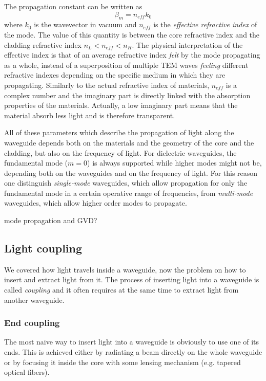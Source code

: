 The propagation constant can be written as
\begin{equation}
\beta_m = n_{eff} k_0
\end{equation}
where $k_0$ is the wavevector in vacuum and $n_{eff}$ is the \textit{effective refractive index} of the mode.
The value of this quantity is between the core refractive index and the cladding refractive index $n_L < n_{eff} < n_H$.
The physical interpretation of the effective index is that of an average refractive index \textit{felt} by the mode propagating as a whole, instead of a superposition of multiple TEM waves \textit{feeling} different refractive indexes depending on the specific medium in which they are propagating.
Similarly to the actual refractive index of materials, $n_{eff}$ is a complex number and the imaginary part is directly linked with the absorption properties of the materials.
Actually, a low imaginary part means that the material absorb less light and is therefore transparent.

All of these parameters which describe the propagation of light along the waveguide depends both on the materials and the geometry of the core and the cladding, but also on the frequency of light.
For dielectric waveguides, the fundamental mode ($m=0$) is always supported while higher modes might not be, depending both on the waveguides and on the frequency of light.
For this reason one distinguish \textit{single-mode} waveguides, which allow propagation for only the fundamental mode in a certain operative range of frequencies, from \textit{multi-mode} waveguides, which allow higher order modes to propagate.

\LARGE { mode propagation and GVD? } \normalsize

\subsection{Light coupling}
\label{ssec:light_coupling}
We covered how light travels inside a waveguide, now the problem on how to insert and extract light from it.
The process of inserting light into a waveguide is called \textit{coupling} and it often requires at the same time to extract light from another waveguide.

\subsubsection{End coupling}
\label{sssec:end_coupling}
The most naive way to insert light into a waveguide is obviously to use one of its ends.
This is achieved either by radiating a beam directly on the whole waveguide or by focusing it inside the core with some lensing mechanism (e.g. tapered optical fibers).

